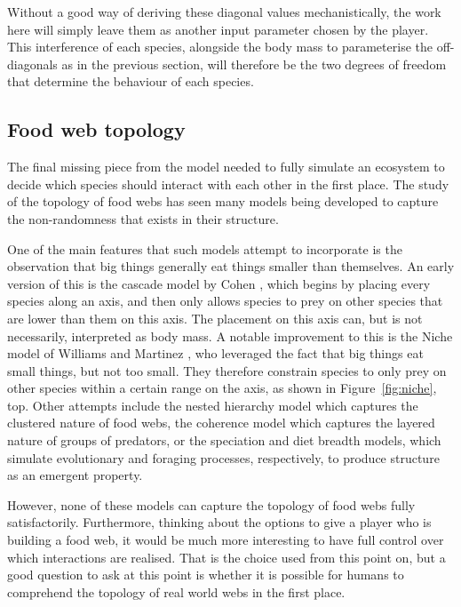 Without a good way of deriving these diagonal values mechanistically, the work here will simply leave them as another input parameter chosen by the player. This interference of each species, alongside the body mass to parameterise the off-diagonals as in the previous section, will therefore be the two degrees of freedom that determine the behaviour of each species. 


\subsection{Food web topology}
\label{sec:topology}
The final missing piece from the model needed to fully simulate an ecosystem to decide which species should interact with each other in the first place.
The study of the topology of food webs has seen many models being developed to capture the non-randomness that exists in their structure.

One of the main features that such models attempt to incorporate is the observation that big things generally eat things smaller than themselves. An early version of this is the cascade model by Cohen \cite{Cohen2012}, which begins by placing every species along an axis, and then only allows species to prey on other species that are lower than them on this axis. The placement on this axis can, but is not necessarily, interpreted as body mass.
A notable improvement to this is the Niche model of Williams and Martinez \cite{Williams2000}, who leveraged the fact that big things eat small things, but not too small. They therefore constrain species to only prey on other species within a certain range on the axis, as shown in Figure~\ref{fig:niche}, top.
Other attempts include the nested hierarchy model \cite{Cattin2004} which captures the clustered nature of food webs, the coherence model \cite{Johnson2014} which captures the layered nature of groups of predators, or the speciation \cite{Rossberg2006} and diet breadth \cite{Petchey2008} models, which simulate evolutionary and foraging processes, respectively, to produce structure as an emergent property. 

However, none of these models can capture the topology of food webs fully satisfactorily. Furthermore, thinking about the options to give a player who is building a food web, it would be much more interesting to have full control over which interactions are realised. That is the choice used from this point on, but a good question to ask at this point is whether it is possible for humans to comprehend the topology of real world webs in the first place.


